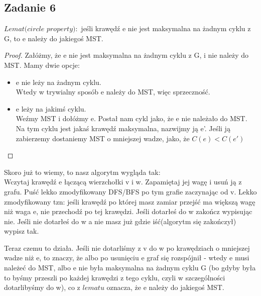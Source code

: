 \documentclass[a4paper]{article}
\begin{document}
\subsection*{Zadanie 6}
$Lemat(circle$ $property):$  jeśli krawędź e nie jest maksymalna na żadnym cyklu z G, to e należy do jakiegoś MST.

\begin{proof}
Załóżmy, że e nie jest maksymalna na żadnym cyklu z G, i nie należy do MST. Mamy dwie opcje:
\begin{itemize}
\item e nie leży na żadnym cyklu.\\
Wtedy w trywialny sposób e należy do MST, więc sprzeczność.
\item e leży na jakimś cyklu.\\
Weźmy MST i dołóżmy e. Postał nam cykl jako, że e nie należało do MST. Na tym cyklu jest jakaś krawędź maksymalna, nazwijmy ją e'. Jeśli ją zabierzemy dostaniemy MST o mniejszej wadze, jako, że $C(e)<C(e')$
\end{itemize}
\end{proof}

Skoro już to wiemy, to nasz algorytm wygląda tak:\\
Wczytaj krawędź e łączącą wierzchołki v i w. Zapamiętaj jej wagę i usuń ją z grafu. Puść lekko zmodyfikowany DFS/BFS po tym grafie zaczynając od v. Lekko zmodyfikowany tzn: jeśli krawędź po której masz zamiar przejść ma większą wagę niż waga e, nie przechodź po tej krawędzi. Jeśli dotarłeś do w zakończ wypisując nie.
Jeśli nie dotarłeś do w a nie masz już gdzie iść(algorytm się zakończył) wypisz tak.

Teraz czemu to działa. Jeśli nie dotarliśmy z v do w po krawędziach o mniejszej wadze niż e, to znaczy, że albo po usunięciu e graf się rozspójnił - wtedy e musi należeć do MST, albo e nie była maksymalna na żadnym cyklu G (bo gdyby była to byśmy przeszli po każdej krawędzi z tego cyklu, czyli w szczególności dotarlibyśmy do w), co z $lematu$ oznacza, że e należy do jakiegoś MST.
\end{document}
